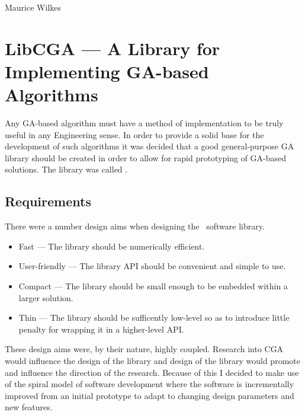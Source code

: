 \begin{savequote}[0.5\paperwidth]
%
{Maurice Wilkes}
\end{savequote}

\chapter{LibCGA --- A Library for Implementing GA-based Algorithms}

Any GA-based algorithm must have a method of implementation to be
truly useful in any Engineering sense. In order to provide a solid
base for the development of such algorithms it was decided that
a good general-purpose GA library should be created in order to 
allow for rapid prototyping of GA-based solutions. The library 
was called \libcga{}.

\section{Requirements}

There were a number design aims when designing the \libcga\ software library.

\begin{itemize}
\item Fast --- The library should be numerically efficient.
\item User-friendly --- The library API should be convenient and simple to use.
\item Compact --- The library should be small enough to be embedded within
a larger solution.
\item Thin --- The library should be sufficently low-level so as to introduce
little penalty for wrapping it in a higher-level API.
\end{itemize}

These design aims were, by their nature, highly coupled. Research into
CGA would influence the design of the library and design of the library would
promote and influence the direction of the research. Because of this
I decided to make use of the spiral model of software development where
the software is incrementally improved from an initial prototype to adapt
to changing design parameters and new features.

